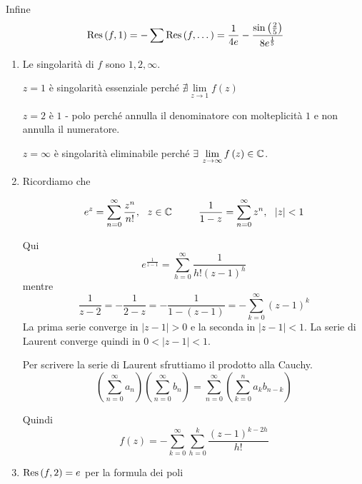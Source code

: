 Infine
\begin{equation*}
\operatorname{Res} \left(f, 1\right) = - \sum \operatorname{Res} \left(f, \dotsc \right) = \frac{1}{4e} - \frac{\sin\left(\frac{2}{5}\right)}{8e^{\frac{1}{5}}}
\end{equation*}
\Soluzione
\begin{enumerate}
\item Le singolarità di $f$ sono $1, 2, \infty $.

$z = 1$ è singolarità essenziale perché $\nexists \lim\limits_{z\rightarrow 1} f\left(z\right)$

$z = 2$ è $1$ - polo perché annulla il denominatore con molteplicità $1$ e non annulla il numeratore.

$z = \infty $ è singolarità eliminabile perché $\exists \lim\limits_{z\rightarrow \infty} f\left(z\right) \in \CC $.
\item Ricordiamo che

\begin{rem}
\begin{equation*}
e^{z} = \sum\limits^{\infty}_{n = 0}\frac{z^{n}}{n!}, \ \ z\in \mathbb{C}  \ \ \ \ \ \ \ \ \frac{1}{1 - z} = \sum\limits^{\infty}_{n = 0} z^{n}, \ \ \left| z\right| < 1
\end{equation*}
\end{rem}

Qui
\begin{equation*}
e^{\frac{1}{z - 1}} = \sum\limits^{\infty}_{h = 0}\frac{1}{h!\left(z - 1\right)^{h}}
\end{equation*}mentre
\begin{equation*}
\frac{1}{z - 2} = - \frac{1}{2 - z} = - \frac{1}{1 - \left(z - 1\right)} = - \sum\limits^{\infty}_{k = 0}\left(z - 1\right)^{k}
\end{equation*}La prima serie converge in $\left| z - 1\right|  > 0$ e la seconda in $\left| z - 1\right| < 1$. La serie di Laurent converge quindi in $0 < \left| z - 1\right| < 1$.
\begin{rem}
Per scrivere la serie di Laurent sfruttiamo il prodotto alla Cauchy.
\begin{equation*}
\left(\sum\limits^{\infty}_{n = 0} a_{n}\right)\left(\sum\limits^{\infty}_{n = 0} b_{n}\right) = \sum\limits^{\infty}_{n = 0}\left(\sum\limits^{n}_{k = 0} a_{k} b_{n - k}\right)
\end{equation*}
\end{rem}Quindi
\begin{equation*}
f\left(z\right) = - \sum\limits^{\infty}_{k = 0}\sum\limits^{k}_{h = 0}\frac{\left(z - 1\right)^{k - 2h}}{h!}
\end{equation*}
\item $\operatorname{Res} \left(f, 2\right) = e$ per la formula dei poli


\end{enumerate}
